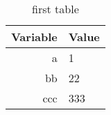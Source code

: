 \begin{table}[h]
\begin{center}
\begin{tabular}{rl} %
\toprule %
Variable & Value\\
\midrule %
a & 1\\
bb & 22\\
ccc & 333\\
\bottomrule %
\end{tabular}
\label{tabMeine}
\caption{first table}
\end{center}
\end{table}